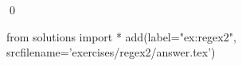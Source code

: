 
\begin{ex} 
  \label{ex:regex2}
  
  \qed
\end{ex} 
\begin{python0}
from solutions import *
add(label="ex:regex2",
    srcfilename='exercises/regex2/answer.tex') 
\end{python0}
